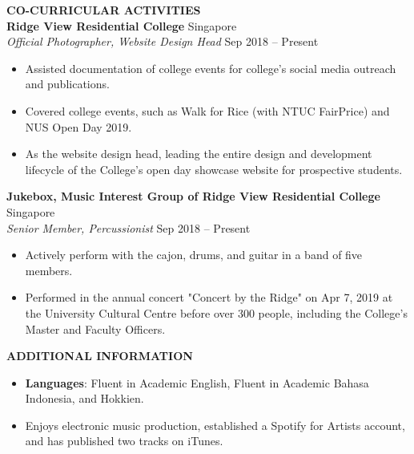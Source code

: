 \documentclass[a4paper, 11pt]{article}
\newcommand{\interspace}{\vspace{10pt}}
\newcommand{\intraspace}{\vspace{5pt}}
\begin{document}
	\interspace
	
	\textbf{\large CO-CURRICULAR ACTIVITIES} \hrulefill \\
	\textbf{Ridge View Residential College} \hfill Singapore\\
	\textit{Official Photographer, Website Design Head} \hfill Sep 2018 -- Present
	\begin{itemize}[leftmargin=*, noitemsep, topsep=0pt]
		\item Assisted documentation of college events for college’s social media outreach and publications.
		\item Covered college events, such as Walk for Rice (with NTUC FairPrice) and NUS Open Day 2019.
		\item As the website design head, leading the entire design and development lifecycle of the College's open day showcase website for prospective students.
	\end{itemize}
	\intraspace
	
	\textbf{Jukebox, Music Interest Group of Ridge View Residential College} \hfill Singapore\\
	\textit{Senior Member, Percussionist} \hfill Sep 2018 -- Present
	\begin{itemize}[leftmargin=*, noitemsep, topsep=0pt]
		\item Actively perform with the cajon, drums, and guitar in a band of five members.
		\item Performed in the annual concert "Concert by the Ridge" on Apr 7, 2019 at the University Cultural Centre before over 300 people, including the College’s Master and Faculty Officers.
	\end{itemize}

	\interspace
	
	\textbf{\large ADDITIONAL INFORMATION} \hrulefill
	\begin{itemize}[leftmargin=*, noitemsep, topsep=0pt]
		\item \textbf{Languages}: Fluent in Academic English, Fluent in Academic Bahasa Indonesia, and Hokkien.
		\item Enjoys electronic music production, established a Spotify for Artists account, and has published two tracks on iTunes.
	\end{itemize}
\end{document}
